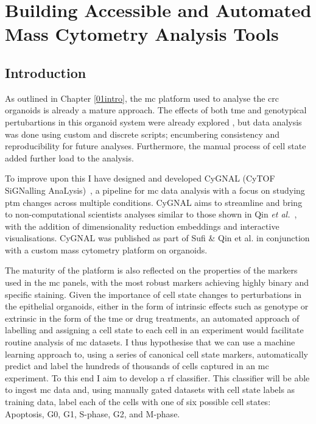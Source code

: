 \chapter{Building Accessible and Automated Mass Cytometry Analysis Tools}
\label{03cytof}

\section{Introduction}


As outlined in Chapter \ref{01intro}, the \acrfull{mc} platform used to analyse the \acrfull{crc} organoids is already a mature approach. The effects of both \acrfull{tme} and genotypical pertubartions in this organoid system were already explored \cite{qin_cell-type-specific_2020}, but data analysis was done using custom and discrete scripts; encumbering consistency and reproducibility for future analyses. Furthermore, the manual process of cell state added further load to the analysis.

To improve upon this I have designed and developed CyGNAL (CyTOF SiGNalling AnaLysis)~\cite{ferran_cardoso_tape-labcygnal_2021}, a pipeline for \acrshort{mc} data analysis with a focus on studying \acrfull{ptm} changes across multiple conditions. CyGNAL aims to streamline and bring to non-computational scientists analyses similar to those shown in Qin \emph{et al.}~\cite{qin_cell-type-specific_2020}, with the addition of dimensionality reduction embeddings and interactive visualisations. CyGNAL was published as part of Sufi \& Qin et al. \cite{sufi_multiplexed_2021} in conjunction with a custom mass cytometry platform on organoids.

The maturity of the platform is also reflected on the properties of the markers used in the \acrshort{mc} panels, with the most robust markers achieving highly binary and specific staining. Given the importance of cell state changes to perturbations in the epithelial organoids, either in the form of intrinsic effects such as genotype or extrinsic in the form of the \acrshort{tme} or drug treatments, an automated approach of labelling and assigning a cell state to each cell in an experiment would facilitate routine analysis of \acrshort{mc} datasets. 
I thus hypothesise that we can use a machine learning approach to, using a series of canonical cell state markers, automatically predict and label the hundreds of thousands of cells captured in an \acrshort{mc} experiment. To this end I aim to develop a \acrfull{rf} classifier. This classifier will be able to ingest \acrshort{mc} data and, using manually gated datasets with cell state labels as training data, label each of the cells with one of six possible cell states: Apoptosis, G0, G1, S-phase, G2, and M-phase. 

